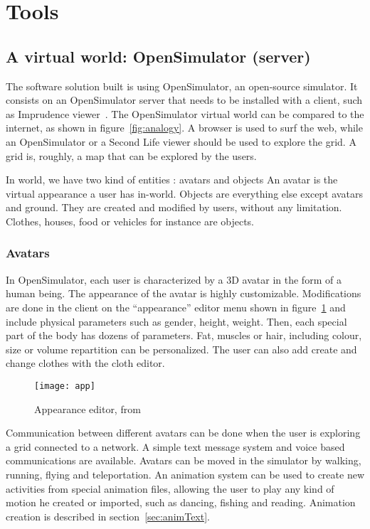\section{Tools}
\label{sec:devtools}



\subsection{A virtual world: OpenSimulator (server)}
The software solution built is using OpenSimulator, an open-source simulator. It consists on an OpenSimulator server that needs to be installed with a client, such as Imprudence viewer~\cite{imprudenceWebsite}.
The OpenSimulator virtual world can be compared to the internet, as shown in figure~\ref{fig:analogy}. A browser is used to surf the web, while an OpenSimulator or a Second Life viewer should be used to explore the grid. A grid is, roughly, a map that can be explored by the users. 

In world, we have two kind of entities : avatars and objects %
An avatar is the virtual appearance a user has in-world. %
Objects are everything else except avatars and ground. They are created and modified by users, without any limitation. Clothes, houses, food or vehicles for instance are objects.


\subsubsection{Avatars}
In OpenSimulator, each user is characterized by a 3D avatar in the form of a human being. The appearance of the avatar is highly customizable. Modifications are done in the client on the ``appearance'' editor menu shown in figure~\ref{fig:app} and include physical parameters such as gender, height, weight. Then, each special part of the body has dozens of parameters. Fat, muscles or hair, including colour, size or volume repartition can be personalized. The user can also add create and change clothes with the cloth editor.

\begin{figure}[h]
  \caption{Appearance editor, from ~\cite{SLAvatar}}
  \centering
  \texttt{[image: app]}
  \label{fig:app}
\end{figure}
Communication between different avatars can be done when the user is exploring a grid connected to a network. A simple text message system and voice based communications are available. 
Avatars can be moved in the simulator by walking, running, flying and teleportation. An animation system can be used to create new activities from special animation files, allowing the user to play any kind of motion he created or imported, such as dancing, fishing and reading. Animation creation is described in section~\ref{sec:animText}.

